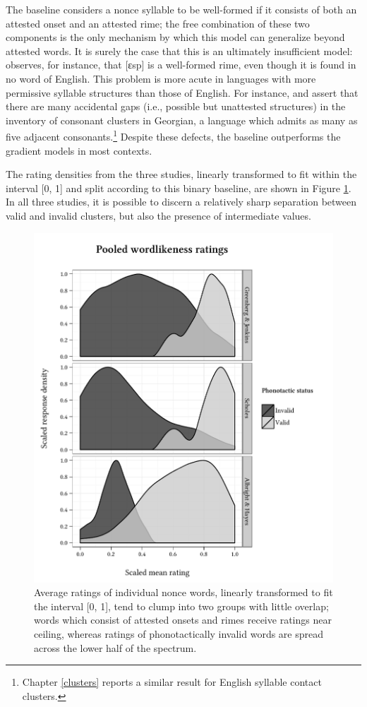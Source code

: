 The baseline considers a nonce syllable to be well-formed if it consists of both an attested onset and an attested rime; the free combination of these two components is the only mechanism by which this model can generalize beyond attested words. It is surely the case that this is an ultimately insufficient model: \citet{Albright2009a} observes, for instance, that [ɛsp] is a well-formed rime, even though it is found in no word of English. This problem is more acute in languages with more permissive syllable structures than those of English. For instance, \citet{Fischer-Jorgensen1952} and \citet{Vogt1954} assert that there are many accidental gaps (i.e., possible but unattested structures) in the inventory of consonant clusters in Georgian, a language which admits as many as five adjacent consonants.\footnote{
Chapter \ref{clusters} 
reports a similar result for English syllable contact clusters.} Despite these defects, the baseline outperforms the gradient models in most contexts.

The rating densities from the three studies, linearly transformed to fit within the interval [0, 1] and split according to this binary baseline, are shown in Figure \ref{dsn}. In all three studies, it is possible to discern a relatively sharp separation between valid and invalid clusters, but also the presence of intermediate values.

\begin{figure} 
\centering
\includegraphics{density.pdf}
\caption{Average ratings of individual nonce words, linearly transformed to fit the interval [0, 1], tend to clump into two groups with little overlap; words which consist of  attested onsets and rimes receive ratings near ceiling, whereas ratings of phonotactically invalid words are spread across the lower half of the spectrum.}
\label{dsn}
\end{figure}

